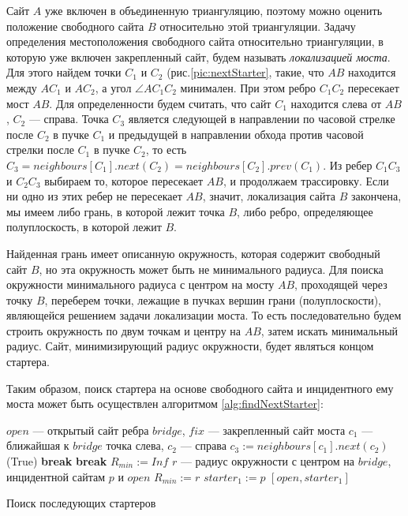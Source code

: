 \documentclass[12pt]{article}
\newcommand{\Break}{\State \textbf{break} }
\begin{document}
Сайт $A$ уже включен в объединенную триангуляцию,
поэтому можно оценить положение свободного сайта $B$ относительно этой триангуляции.
Задачу определения местоположения свободного сайта относительно триангуляции,
в которую уже включен закрепленный сайт, будем называть {\itshape локализацией моста}.
Для этого найдем точки $C_1$ и $C_2$ (рис.\ref{pic:nextStarter}, такие, что $AB$ находится между $AC_1$ и $AC_2$, а угол $\angle AC_1C_2$ минимален.
При этом ребро $C_1C_2$ пересекает мост $AB$.
Для определенности будем считать, что сайт $C_1$ находится слева от $AB$, $C_2$ --- справа.
Точка $C_3$ является следующей в направлении по часовой стрелке после $C_2$ в пучке $C_1$ и предыдущей в направлении обхода против часовой стрелки после $C_1$ в пучке $C_2$, то есть $C_3 = neighbours[C_1].next(C_2) = neighbours[C_2].prev(C_1)$.
Из ребер $C_1C_3$ и $C_2C_3$ выбираем то, которое пересекает $AB$, и продолжаем трассировку.
Если ни одно из этих ребер не пересекает $AB$, значит, локализация сайта $B$ закончена,
мы имеем либо грань, в которой лежит точка $B$, либо ребро, определяющее полуплоскость, в которой лежит $B$.

Найденная грань имеет описанную окружность, которая содержит свободный сайт $B$, но эта окружность может быть не минимального радиуса.
Для поиска окружности минимального радиуса с центром на мосту $AB$, проходящей через точку $B$,
переберем точки, лежащие в пучках вершин грани (полуплоскости), являющейся решением задачи локализации моста.
То есть последовательно будем строить окружность по двум точкам и центру на $AB$, затем искать минимальный радиус.
Сайт, минимизирующий радиус окружности, будет являться концом стартера.

Таким образом, поиск стартера на основе свободного сайта и инцидентного ему моста
может быть осуществлен алгоритмом \ref{alg:findNextStarter}:

\begin{algorithm}[htb!]
\begin{algorithmic}[1]
	\State $open$ --- открытый сайт ребра $bridge$, $fix$ --- закрепленный сайт моста
	\State $c_1$ --- ближайшая к $bridge$ точка слева, $c_2$ --- справа
	\State $c_3 := neighbours[c_1].next(c_2)$
	\While(True)
	        \Break
	    \EndIf
	    \Else
	        \Break
	    \EndIf
	\EndWhile
	\State $R_{min} := Inf$
	\For{$p \in checkPoints$}
		\State $r$ --- радиус окружности с центром на $bridge$, инцидентной сайтам $p$ и $open$
		\If{$r < R_{min}$}
			\State $R_{min} := r$
			\State $starter_{1} := p$
		\EndIf
	\EndFor
	\Return $[open, starter_{1}]$
\EndProcedure
\end{algorithmic}
\caption{Поиск последующих стартеров}
\label{alg:findNextStarter}
\end{algorithm}
\end{document}

